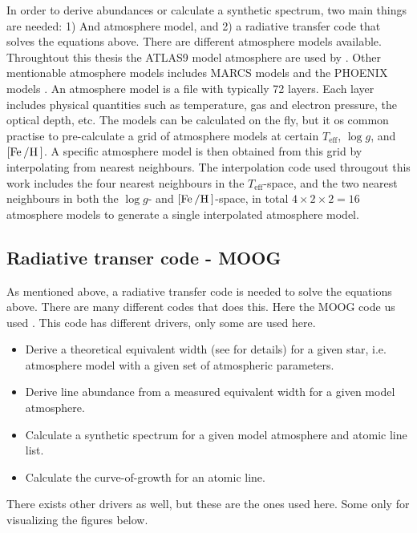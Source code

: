 In order to derive abundances or calculate a synthetic spectrum, two main things
are needed: 1) And atmosphere model, and 2) a radiative transfer code that
solves the equations above. There are different atmosphere models available.
Throughtout this thesis the ATLAS9 model atmosphere are used by
\citet{Kurucz1993}. Other mentionable atmosphere models includes MARCS models
\citep{Gustafson2008} and the PHOENIX models \citep{Husser2013}. An atmosphere
model is a file with typically 72 layers. Each layer includes physical
quantities such as temperature, gas and electron pressure, the optical depth,
etc. The models can be calculated on the fly, but it os common practise to
pre-calculate a grid of atmosphere models at certain $T_\mathrm{eff}$, $\log g$,
and $[\ion{Fe}/\ion{H}]$. A specific atmosphere model is then obtained from this
grid by interpolating from nearest neighbours. The interpolation code used
througout this work includes the four nearest neighbours in the
$T_\mathrm{eff}$-space, and the two nearest neighbours in both the $\log g$- and
$[\ion{Fe}/\ion{H}]$-space, in total $4\times2\times2=16$ atmosphere models to
generate a single interpolated atmosphere model.



\subsection{Radiative transer code - MOOG}

As mentioned above, a radiative transfer code is needed to solve the equations
above. There are many different codes that does this. Here the MOOG code us used
\citep{Sneden1973}. This code has different drivers, only some are used here.

\begin{itemize}
  \item Derive a theoretical equivalent width (see  for details)
        for a given star, i.e. atmosphere model with a given set of atmospheric
        parameters.
  \item Derive line abundance from a measured equivalent width for a given model
        atmosphere.
  \item Calculate a synthetic spectrum for a given model atmosphere and atomic
        line list.
  \item Calculate the curve-of-growth for an atomic line.
\end{itemize}
There exists other drivers as well, but these are the ones used here. Some only
for visualizing the figures below.



